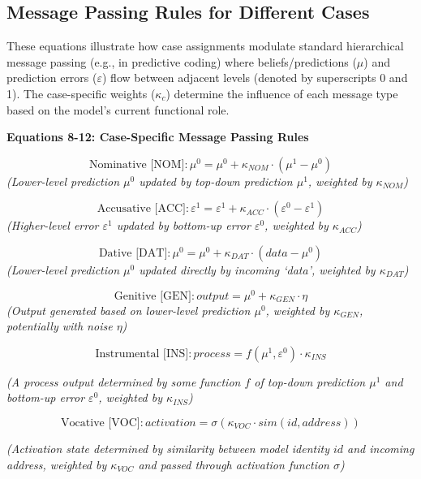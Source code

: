 \documentclass[
  11pt,
  letterpaper,
]{article}
\begin{document}
\hypertarget{message-passing-rules-for-different-cases}{%
\subsection{Message Passing Rules for Different
Cases}\label{message-passing-rules-for-different-cases}}

These equations illustrate how case assignments modulate standard
hierarchical message passing (e.g., in predictive coding) where
beliefs/predictions (\(\mu\)) and prediction errors (\(\varepsilon\))
flow between adjacent levels (denoted by superscripts 0 and 1). The
case-specific weights (\(\kappa_c\)) determine the influence of each
message type based on the model's current functional role.

\textbf{Equations 8-12: Case-Specific Message Passing Rules}

\[\text{Nominative [NOM]}: \mu^0 = \mu^0 + \kappa_{NOM} \cdot (\mu^1 - \mu^0)  \tag{8}\]
\emph{(Lower-level prediction \(\mu^0\) updated by top-down prediction
\(\mu^1\), weighted by \(\kappa_{NOM}\))}

\[\text{Accusative [ACC]}: \varepsilon^1 = \varepsilon^1 + \kappa_{ACC} \cdot (\varepsilon^0 - \varepsilon^1)  \tag{9}\]
\emph{(Higher-level error \(\varepsilon^1\) updated by bottom-up error
\(\varepsilon^0\), weighted by \(\kappa_{ACC}\))}

\[\text{Dative [DAT]}: \mu^0 = \mu^0 + \kappa_{DAT} \cdot (data - \mu^0)  \tag{10}\]
\emph{(Lower-level prediction \(\mu^0\) updated directly by incoming
`data', weighted by \(\kappa_{DAT}\))}

\[\text{Genitive [GEN]}: output = \mu^0 + \kappa_{GEN} \cdot \eta  \tag{11}\]
\emph{(Output generated based on lower-level prediction \(\mu^0\),
weighted by \(\kappa_{GEN}\), potentially with noise \(\eta\))}

\[\text{Instrumental [INS]}: process = f(\mu^1, \varepsilon^0) \cdot \kappa_{INS} \tag{12}\]

\emph{(A process output determined by some function \(f\) of top-down
prediction \(\mu^1\) and bottom-up error \(\varepsilon^0\), weighted by
\(\kappa_{INS}\))}

\[\text{Vocative [VOC]}: activation = \sigma(\kappa_{VOC} \cdot sim(id, address)) \tag{12a}\]

\emph{(Activation state determined by similarity between model identity
\(id\) and incoming address, weighted by \(\kappa_{VOC}\) and passed
through activation function \(\sigma\))}
\end{document}
